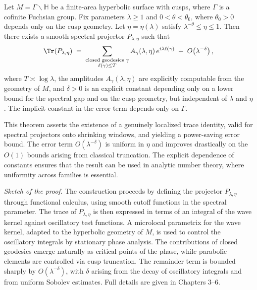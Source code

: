 \begin{theorem}\label{thm:localized-trace}
Let $M=\Gamma\backslash\mathbb{H}$ be a finite-area hyperbolic surface with cusps,
where $\Gamma$ is a cofinite Fuchsian group. Fix parameters $\lambda\ge 1$ and
$0<\theta<\theta_0$, where $\theta_0>0$ depends only on the cusp geometry.
Let $\eta=\eta(\lambda)$ satisfy $\lambda^{-\theta}\le \eta\le 1$.
Then there exists a smooth spectral projector $P_{\lambda,\eta}$ such that
\[
  \Tr(P_{\lambda,\eta})
  \;=\;
  \sum_{\substack{\text{closed geodesics } \gamma \\ \ell(\gamma)\le T}}
  A_\gamma(\lambda,\eta)\,e^{i\lambda \ell(\gamma)}
  \;+\;
  O\!\left(\lambda^{-\delta}\right),
\]
where $T\asymp \log \lambda$, the amplitudes $A_\gamma(\lambda,\eta)$ are
explicitly computable from the geometry of $M$, and $\delta>0$ is an explicit
constant depending only on a lower bound for the spectral gap and on the cusp
geometry, but independent of $\lambda$ and $\eta$. The implicit constant in the
error term depends only on $\Gamma$.
\end{theorem}

This theorem asserts the existence of a genuinely localized trace identity,
valid for spectral projectors onto shrinking windows, and yielding a
power-saving error bound. The error term $O(\lambda^{-\delta})$ is uniform in
$\eta$ and improves drastically on the $O(1)$ bounds arising from classical
truncation. The explicit dependence of constants ensures that the result can be
used in analytic number theory, where uniformity across families is essential.

\medskip

\noindent \textit{Sketch of the proof.}
The construction proceeds by defining the projector $P_{\lambda,\eta}$ through
functional calculus, using smooth cutoff functions in the spectral parameter.
The trace of $P_{\lambda,\eta}$ is then expressed in terms of an integral of the
wave kernel against oscillatory test functions. A microlocal parametrix for the
wave kernel, adapted to the hyperbolic geometry of $M$, is used to control the
oscillatory integrals by stationary phase analysis. The contributions of closed
geodesics emerge naturally as critical points of the phase, while parabolic
elements are controlled via cusp truncation. The remainder term is bounded
sharply by $O(\lambda^{-\delta})$, with $\delta$ arising from the decay of
oscillatory integrals and from uniform Sobolev estimates. Full details are given
in Chapters 3–6.

